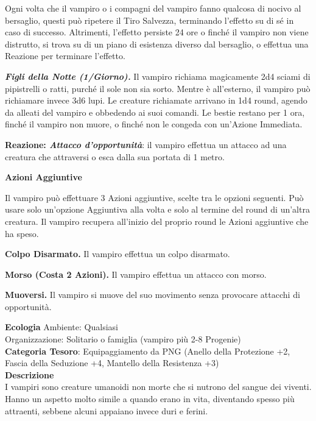 \begin{multicols}{2}
{Ogni volta che il vampiro o i compagni del vampiro fanno qualcosa di nocivo al bersaglio, questi può ripetere il Tiro Salvezza, terminando l'effetto su di sé in caso di successo. Altrimenti, l'effetto persiste 24 ore o finché il vampiro non viene distrutto, si trova su di un piano di esistenza diverso dal bersaglio, o effettua una Reazione per terminare l'effetto.

\emph{\textbf{Figli della Notte (1/Giorno).}} Il vampiro richiama magicamente 2d4 sciami di pipistrelli o ratti, purché il sole non sia sorto. Mentre è all'esterno, il vampiro può richiamare invece 3d6 lupi. Le creature richiamate arrivano in 1d4 round, agendo da alleati del vampiro e obbedendo ai suoi comandi. Le bestie restano per 1 ora, finché il vampiro non muore, o finché non le congeda con un'Azione Immediata.

\textbf{Reazione: \emph{Attacco d'opportunità}}: il vampiro effettua un attacco ad una creatura che attraversi o esca dalla sua portata di 1 metro.

\textbf{Azioni Aggiuntive}

Il vampiro può effettuare 3 Azioni aggiuntive, scelte tra le opzioni seguenti. Può usare solo un'opzione Aggiuntiva alla volta e solo al termine del round di un'altra creatura. Il vampiro recupera all'inizio del proprio round le Azioni aggiuntive che ha speso.

\textbf{Colpo Disarmato.} Il vampiro effettua un colpo disarmato.

\textbf{Morso (Costa 2 Azioni).} Il vampiro effettua un attacco con morso.

\textbf{Muoversi.} Il vampiro si muove del suo movimento senza provocare attacchi di opportunità.

\textbf{Ecologia}
Ambiente: Qualsiasi\\
Organizzazione: Solitario o famiglia (vampiro più 2-8 Progenie)\\
\textbf{Categoria Tesoro}: Equipaggiamento da PNG (Anello della Protezione +2, Fascia della Seduzione +4, Mantello della Resistenza +3)\\
\textbf{Descrizione}\\
I vampiri sono creature umanoidi non morte che si nutrono del sangue dei viventi. Hanno un aspetto molto simile a quando erano in vita, diventando spesso più attraenti, sebbene alcuni appaiano invece duri e ferini.

}
\end{multicols}
